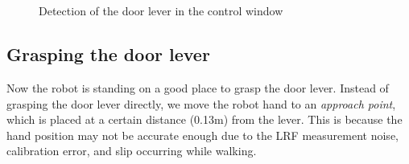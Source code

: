\begin{figure}[t]
	\centering
	\quad
	\\
	\quad
	\\
	\caption{Detection of the door lever in the control window}
	\label{fig:door_manip_markers}
\end{figure}

\subsection{Grasping the door lever}
%
Now the robot is standing on a good place to grasp the door lever.
Instead of grasping the door lever directly, we move the robot hand to an {\it approach point},
which is placed at a certain distance (0.13m) from the lever. 
This is because the hand position may not be accurate enough due to the LRF measurement noise,
calibration error, and slip occurring while walking.

